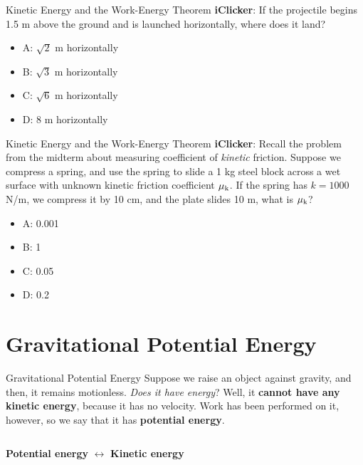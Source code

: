 \documentclass{beamer}
\begin{document}
\begin{frame}{Kinetic Energy and the Work-Energy Theorem}
\textbf{iClicker}: If the projectile begins 1.5 m above the ground and is launched horizontally, where does it land?
\begin{itemize}
\item A: $\sqrt{2}$ m horizontally
\item B: $\sqrt{3}$ m horizontally
\item C: $\sqrt{6}$ m horizontally
\item D: 8 m horizontally 
\end{itemize}
\end{frame}

\begin{frame}{Kinetic Energy and the Work-Energy Theorem}
\textbf{iClicker}: Recall the problem from the midterm about measuring coefficient of \textit{kinetic} friction.  Suppose we compress a spring, and use the spring to slide a 1 kg steel block across a wet surface with unknown kinetic friction coefficient $\mu_{\rm k}$.  If the spring has $k=1000$ N/m, we compress it by 10 cm, and the plate slides 10 m, what is $\mu_{\rm k}$?
\begin{itemize}
\item A: 0.001
\item B: 1
\item C: 0.05
\item D: 0.2 
\end{itemize}
\end{frame}

\section{Gravitational Potential Energy}

\begin{frame}{Gravitational Potential Energy}
Suppose we raise an object against gravity, and then, it remains motionless.  \textit{Does it have energy}?  Well, it \textbf{cannot have any kinetic energy}, because it has no velocity.  Work has been performed on it, however, so we say that it has \textbf{potential energy}. \\ \vspace{1cm}
\begin{columns}[T]
\begin{column}{0.8\textwidth}
\centering
\textbf{\alert{Potential energy}} $\leftrightarrow$ \textbf{\alert{Kinetic energy}}
\end{column}
\end{columns}
\end{frame}
\end{document}
